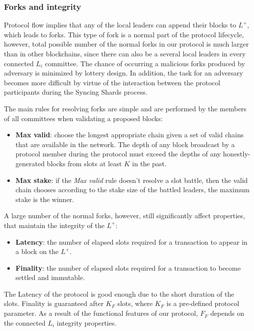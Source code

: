 \subsubsection{Forks and integrity}\label{subsec:resolving-forks}

Protocol flow implies that any of the local leaders can append their blocks to $L^+$, which leads to forks.
This type of fork is a normal part of the protocol lifecycle, however, total possible number of the normal forks in our protocol is much larger than in other blockchains, since there can also be a several local leaders in every connected $L_i$ committee.
The chance of occurring a malicious forks produced by adversary is minimized by lottery design.
In addition, the task for an adversary becomes more difficult by virtue of the interaction between the protocol participants during the Syncing Shards process.

The main rules for resolving forks are simple and are performed by the members of all committees when validating a proposed blocks:
\begin{itemize}
    \item \textbf{Max valid}: choose the longest appropriate chain given a set of valid chains that are available in the network.
    The depth of any block broadcast by a protocol member during the protocol must exceed the depths of any honestly-generated blocks from slots at least $K$ in the past.
    \item \textbf{Max stake}: if the \emph{Max valid} rule doesn't resolve a slot battle, then the valid chain chooses according to the stake size of the battled leaders, the maximum stake is the winner.
\end{itemize}

A large number of the normal forks, however, still significantly affect properties, that maintain the integrity of the $L^+$:
\begin{itemize}
    \item \textbf{Latency}: the number of elapsed slots required for a transaction to appear in a block on the $L^+$.
    \item \textbf{Finality}: the number of elapsed slots required for a transaction to become settled and immutable.
\end{itemize}
The Latency of the protocol is good enough due to the short duration of the slots.
Finality is guaranteed after $K_F$ slots, where $K_F$ is a pre-defined protocol parameter.
As a result of the functional features of our protocol, $F_F$ depends on the connected $L_i$ integrity properties.

